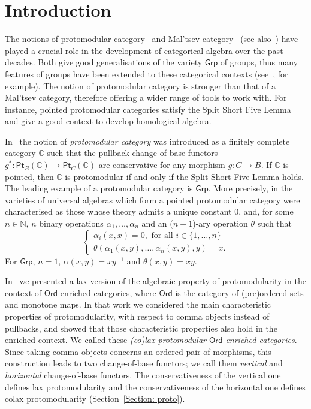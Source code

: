 \documentclass[11pt]{amsart}
\theoremstyle{plain}
\theoremstyle{definition}
\theoremstyle{remark}
\newcommand{\C}{\ensuremath{\mathbb{C}}}
\newcommand{\Grp}{\ensuremath{\mathsf{Grp}}}
\newcommand{\Ord}{\ensuremath{\mathsf{Ord}}}
\newcommand{\Pt}{\ensuremath{\mathsf{Pt}}}
\begin{document}
\maketitle

\section*{Introduction}
The notions of protomodular category~\cite{NEKEAC} and Mal'tsev category~\cite{CLP} (see also~\cite{CKP, CPP, BB}) have played a crucial role in the development of categorical algebra over the past decades. Both give good generalisations of the variety $\Grp$ of groups, thus many features of groups have been extended to these categorical contexts (see~\cite{BB}, for example). The notion of protomodular category is stronger than that of a Mal'tsev category, therefore offering a wider range of tools to work with. For instance, pointed protomodular categories satisfy the Split Short Five Lemma and give a good context to develop homological algebra.

In~\cite{NEKEAC} the notion of \emph{protomodular category} was introduced as a finitely complete\footnotemark{} category $\C$ such that the pullback change-of-base functors $g^*\colon \Pt_B(\C) \to \Pt_C(\C)$ are conservative for any morphism $g\colon C\to B$. If $\C$ is pointed, then $\C$ is protomodular if and only if the Split Short Five Lemma holds. The leading example of a protomodular category is $\Grp$. More precisely, in \cite{BJ} the varieties of universal algebras which form a pointed protomodular category were characterised as those whose theory admits a unique constant $0$, and, for some $n\in\mathbb{N}$, $n$ binary operations $\alpha_1,\dots,\alpha_n$ and an ($n+1$)-ary operation $\theta$ such that
\begin{equation}\label{proto ops}
	\left\{\begin{array}{l} \alpha_i(x,x)=0, \text{ for all }i\in\{1,\dots,n\} \\ \theta(\alpha_1(x,y),\dots,\alpha_n(x,y),y)=x.
	\end{array}\right.
\end{equation}
For $\Grp$, $n=1$, $\alpha(x,y)=xy^{-1}$ and $\theta(x,y)=xy$.

In~\cite{CMR} we presented a lax version of the algebraic property of protomodularity in the context of $\Ord$-enriched categories, where $\Ord$ is the category of (pre)ordered sets and monotone maps. In that work we considered the main characteristic properties of protomodularity, with respect to comma objects instead of pullbacks, and showed that those characteristic properties also hold in the enriched context. We called these \emph{(co)lax protomodular $\Ord$-enriched categories}. Since taking comma objects concerns an ordered pair of morphisms, this construction leads to two change-of-base functors; we call them \emph{vertical} and \emph{horizontal} change-of-base functors. The conservativeness of the vertical one defines lax protomodularity and the conservativeness of the horizontal one defines colax protomodularity (Section~\ref{Section: proto}).
\end{document}
